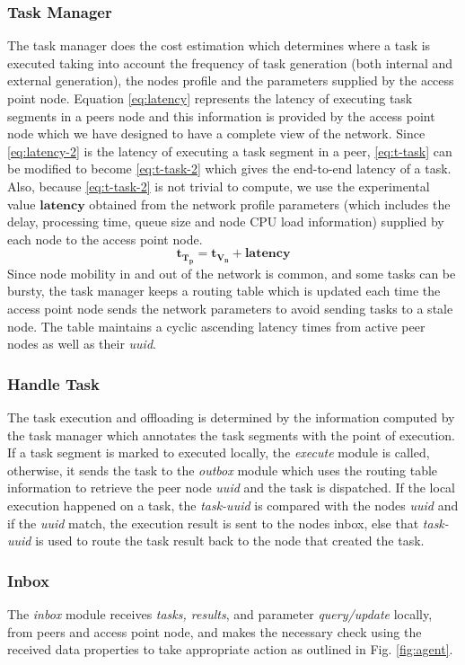 \subsubsection{Task Manager}
The task manager does the cost estimation which determines 
where a task is executed taking into account the frequency of 
task generation (both internal and external generation), the 
nodes profile and the parameters supplied by the access 
point node. Equation \eqref{eq:latency} represents the 
latency of executing task segments in a peers node and 
this information is provided by the access point node which 
we have designed to have a complete view of the network. 
Since \eqref{eq:latency-2} is the latency of executing a task 
segment in a peer, \eqref{eq:t-task} can be modified to 
become \eqref{eq:t-task-2} which gives the end-to-end latency 
of a task. Also, because \eqref{eq:t-task-2} is not trivial 
to compute, we use the experimental value $ 
\bm{\text{latency}} $ obtained from the network profile 
parameters (which includes the delay, processing time, queue 
size and node CPU load information) supplied by each node to 
the access point node.
\begin{equation}
	\bm{t_{T_p} = t_{V_{n}} + \text{latency} }
	\label{eq:t-task-2}
\end{equation}
Since node mobility in and out of the network is 
common, and some tasks can be bursty, the task manager keeps 
a routing table which is updated each time the access point 
node sends the network parameters to avoid sending tasks to a 
stale node. The table maintains a cyclic ascending 
latency times from active peer nodes as well as their 
\emph{uuid}.
\subsubsection{Handle Task}
The task execution and offloading is determined by the 
information computed by the task manager which annotates the 
task segments with the point of execution. If a task segment 
is marked to executed locally, the \emph{execute} module is 
called, otherwise, it sends the task to the \emph{outbox} 
module which uses the routing table information to retrieve 
the peer node \emph{uuid} and the task is dispatched. If the 
local execution happened on a task, the \emph{task-uuid} is 
compared with the nodes \emph{uuid} and if the 
\emph{uuid} match, the execution result is sent to the 
nodes inbox, else that \emph{task-uuid} is used to route the 
task result back to the node that created the task.
\subsubsection{Inbox}
The \emph{inbox} module receives \emph{tasks, results}, and 
parameter \emph{query/update} locally, from peers 
and access point node, and makes the necessary check using 
the 
received data properties to take appropriate action as 
outlined in Fig. \ref{fig:agent}. 
